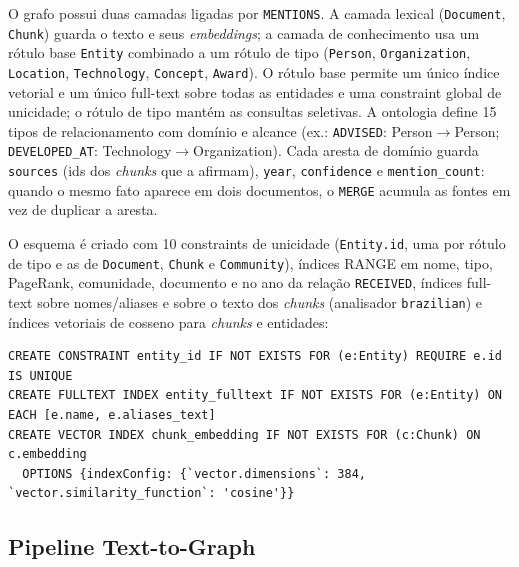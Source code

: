 \documentclass[12pt]{article}
\begin{document}
O grafo possui duas camadas ligadas por \texttt{MENTIONS}. A camada lexical (\texttt{Document}, \texttt{Chunk}) guarda o texto e seus \textit{embeddings}; a camada de conhecimento usa um rótulo base \texttt{Entity} combinado a um rótulo de tipo (\texttt{Person}, \texttt{Organization}, \texttt{Location}, \texttt{Technology}, \texttt{Concept}, \texttt{Award}). O rótulo base permite um único índice vetorial e um único full-text sobre todas as entidades e uma constraint global de unicidade; o rótulo de tipo mantém as consultas seletivas. A ontologia define 15 tipos de relacionamento com domínio e alcance (ex.: \texttt{ADVISED}: Person$\rightarrow$Person; \texttt{DEVELOPED\_AT}: Technology$\rightarrow$Organization). Cada aresta de domínio guarda \texttt{sources} (ids dos \textit{chunks} que a afirmam), \texttt{year}, \texttt{confidence} e \texttt{mention\_count}: quando o mesmo fato aparece em dois documentos, o \texttt{MERGE} acumula as fontes em vez de duplicar a aresta.

O esquema é criado com 10 constraints de unicidade (\texttt{Entity.id}, uma por rótulo de tipo e as de \texttt{Document}, \texttt{Chunk} e \texttt{Community}), índices RANGE em nome, tipo, PageRank, comunidade, documento e no ano da relação \texttt{RECEIVED}, índices full-text sobre nomes/aliases e sobre o texto dos \textit{chunks} (analisador \texttt{brazilian}) e índices vetoriais de cosseno para \textit{chunks} e entidades:

\begin{lstlisting}[language=cypher]
CREATE CONSTRAINT entity_id IF NOT EXISTS FOR (e:Entity) REQUIRE e.id IS UNIQUE
CREATE FULLTEXT INDEX entity_fulltext IF NOT EXISTS FOR (e:Entity) ON EACH [e.name, e.aliases_text]
CREATE VECTOR INDEX chunk_embedding IF NOT EXISTS FOR (c:Chunk) ON c.embedding
  OPTIONS {indexConfig: {`vector.dimensions`: 384, `vector.similarity_function`: 'cosine'}}
\end{lstlisting}

\subsection{Pipeline Text-to-Graph}
\end{document}
